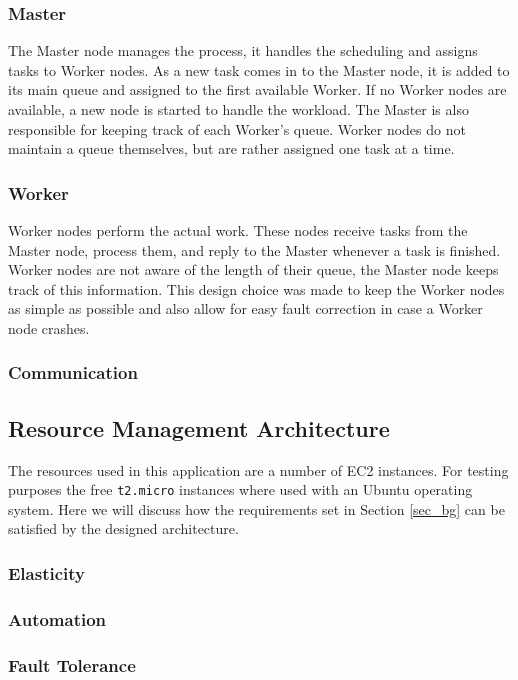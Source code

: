 \documentclass{acm_proc_article-sp}
\begin{document}
\subsubsection{Master}
The Master node manages the process, it handles the scheduling and assigns tasks to Worker nodes.
As a new task comes in to the Master node, it is added to its main queue and assigned to the first available Worker.
If no Worker nodes are available, a new node is started to handle the workload.
The Master is also responsible for keeping track of each Worker's queue.
Worker nodes do not maintain a queue themselves, but are rather assigned one task at a time.

\subsubsection{Worker}
Worker nodes perform the actual work.
These nodes receive tasks from the Master node, process them, and reply to the Master whenever a task is finished.
Worker nodes are not aware of the length of their queue, the Master node keeps track of this information.
This design choice was made to keep the Worker nodes as simple as possible and also allow for easy fault correction in case a Worker node crashes.

\subsubsection{Communication}

\subsection{Resource Management Architecture}
The resources used in this application are a number of EC2 instances.
For testing purposes the free \texttt{t2.micro} instances where used with an Ubuntu operating system.
Here we will discuss how the requirements set in Section \ref{sec_bg} can be satisfied by the designed architecture.

\subsubsection{Elasticity}

\subsubsection{Automation}

\subsubsection{Fault Tolerance}
\end{document}
